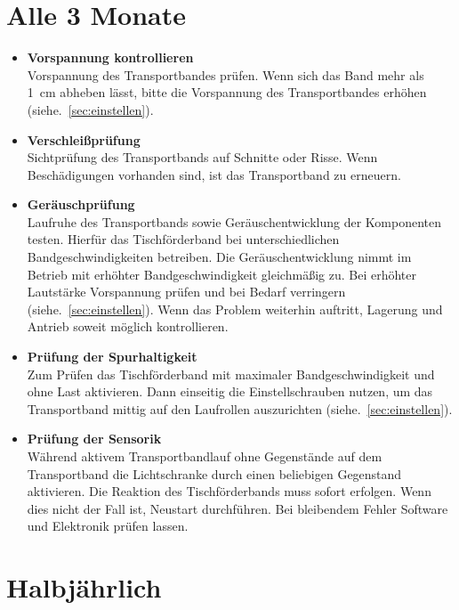 \section{Alle 3 Monate}

\begin{itemize}
	
	\item \textbf{Vorspannung kontrollieren} \\
	Vorspannung des Transportbandes prüfen. Wenn sich das Band mehr als 1 cm abheben lässt, bitte die Vorspannung des Transportbandes erhöhen (siehe.~\ref{sec:einstellen}).
	
	\item \textbf{Verschleißprüfung} \\
	Sichtprüfung des Transportbands auf Schnitte oder Risse. Wenn Beschädigungen vorhanden sind, ist das Transportband zu erneuern.
	
	\item \textbf{Geräuschprüfung} \\
	Laufruhe des Transportbands sowie Geräuschentwicklung der Komponenten testen. Hierfür das Tischförderband bei unterschiedlichen Bandgeschwindigkeiten betreiben. Die Geräuschentwicklung nimmt im Betrieb mit erhöhter Bandgeschwindigkeit gleichmäßig zu. Bei erhöhter Lautstärke Vorspannung prüfen und bei Bedarf verringern (siehe.~\ref{sec:einstellen}). Wenn das Problem weiterhin auftritt, Lagerung und Antrieb soweit möglich kontrollieren.
	
	\item \textbf{Prüfung der Spurhaltigkeit} \\
	Zum Prüfen das Tischförderband mit maximaler Bandgeschwindigkeit und ohne Last aktivieren. Dann einseitig die Einstellschrauben nutzen, um das Transportband mittig auf den Laufrollen auszurichten (siehe.~\ref{sec:einstellen}).
	
	\item \textbf{Prüfung der Sensorik} \\
	Während aktivem Transportbandlauf ohne Gegenstände auf dem Transportband die Lichtschranke durch einen beliebigen Gegenstand aktivieren. Die Reaktion des Tischförderbands muss sofort erfolgen. Wenn dies nicht der Fall ist, Neustart durchführen. Bei bleibendem Fehler Software und Elektronik prüfen lassen.
	
\end{itemize}



\section{Halbjährlich}

